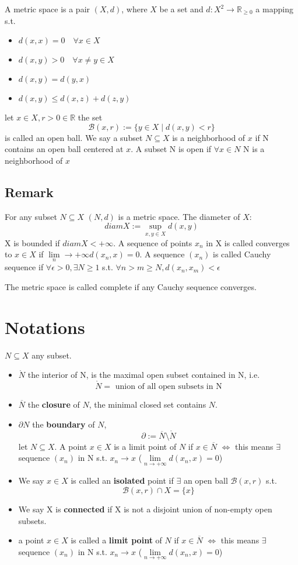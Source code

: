 \documentclass{book}
\begin{document}
A metric space is a pair $(X,d)$, where $X$ be a set and $d:X^2\rightarrow \mathbb{R}_{\geq 0}$ a mapping s.t.
\begin{itemize}
    \item $d(x,x)=0\quad\forall x\in X$
    \item $d(x,y)>0\quad\forall x\neq y\in X$
    \item $d(x,y)=d(y,x)$
    \item $d(x,y)\leq d(x,z)+d(z,y)$
\end{itemize}
let $x\in X, r>0\in \mathbb R$ the set $$\mathcal B(x,r):=\{y\in X\mid d(x,y)<r\}$$ is called an open ball. We say a subset $N\subseteq X$ is a neighborhood of $x$ if N contains an open ball centered at $x$. A subset N is open if $\forall x\in N$ N is a neighborhood of $x$
\subsection*{Remark}
For any subset $N\subseteq X$ $(N,d)$ is a metric space. The diameter of $X$:$$diam X:=\sup\limits_{x,y\in X}d(x,y)$$
X is bounded if $diam X<+\infty$. A sequence of points $x_n$ in X is called converges to $x\in X$ if $\lim\limits_n\rightarrow+\infty d(x_n,x)=0$. A sequence $(x_n)$ is called Cauchy sequence if $\forall \epsilon>0,\exists N\geq1$ s.t. $\forall n>m\geq N, d(x_n,x_m)<\epsilon$

The metric space is called complete if any Cauchy sequence converges.
\section{Notations}
$N\subseteq X$ any subset.
\begin{itemize}
    \item $\mathring N$ the interior of N, is the maximal open subset contained in N, i.e. $$\mathring N=\text{ union of all open subsets in N}$$
    \item $\overline N$ the \textbf{closure} of $N$, the minimal closed set contains $N$.
    \item $\partial N$ the \textbf{boundary} of $N$, $$\partial:=\overline N\setminus \mathring N$$let $N\subseteq X$. A point $x\in X$ is a limit point of $N$ if $x\in \overline N$ $\Leftrightarrow$ this means $\exists$ sequence $(x_n)$ in N s.t. $x_n\rightarrow x$ ($\lim\limits_{n\rightarrow+\infty}d(x_n,x)=0$)
    \item We say $x\in X$ is called an \textbf{isolated} point if $\exists$ an open ball $\mathcal B(x,r)$ s.t. $$\mathcal B(x,r)\cap X=\{x\}$$
    \item We say X is \textbf{connected} if X is not a disjoint union of non-empty open subsets.
    \item a point $x\in X$ is called a \textbf{limit point} of $N$ if $x\in \overline N$ $\Leftrightarrow$ this means $\exists$ sequence $(x_n)$ in N s.t. $x_n\rightarrow x$ ($\lim\limits_{n\rightarrow+\infty}d(x_n,x)=0$)
\end{itemize}
\end{document}
